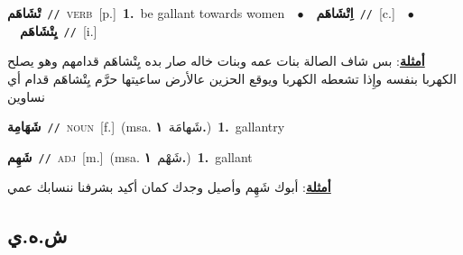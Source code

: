 \documentclass[10pt,a4paper,twoside]{article} %
\begin{document}
\begin{multicols}{2}
{\setlength\topsep{0pt}\textbf{\foreignlanguage{arabic}{تْشَاهَم}}\ {\color{gray}\texttt{//}\color{black}}\ \textsc{verb}\ [p.]\ \textbf{1.}~be gallant towards women\ \ $\bullet$\ \ \setlength\topsep{0pt}\textbf{\foreignlanguage{arabic}{اِتْشَاهَم}}\ {\color{gray}\texttt{//}\color{black}}\ [c.]\ \ $\bullet$\ \ \setlength\topsep{0pt}\textbf{\foreignlanguage{arabic}{يِتْشَاهَم}}\ {\color{gray}\texttt{//}\color{black}}\ [i.]\  \begin{flushright}\color{gray}\foreignlanguage{arabic}{\textbf{\underline{\foreignlanguage{arabic}{أمثلة}}}: بس شاف الصالة بنات عمه وبنات خاله صار بده يِتْشاهَم قدامهم وهو يصلح الكهربا بنفسه وإِذا تشعطه الكهربا ويوقع الحزين عالأرض ساعيتها حرَّم يِتْشاهَم قدام أي نساوين}\end{flushright}\color{black}} \vspace{2mm}

{\setlength\topsep{0pt}\textbf{\foreignlanguage{arabic}{شَهَامِة}}\ {\color{gray}\texttt{//}\color{black}}\ \textsc{noun}\ [f.]\ \color{gray}(msa. \foreignlanguage{arabic}{شَهامَة}~\foreignlanguage{arabic}{\textbf{١.}})\color{black}\ \textbf{1.}~gallantry\ } \vspace{2mm}

{\setlength\topsep{0pt}\textbf{\foreignlanguage{arabic}{شَهِم}}\ {\color{gray}\texttt{//}\color{black}}\ \textsc{adj}\ [m.]\ \color{gray}(msa. \foreignlanguage{arabic}{شَهْم}~\foreignlanguage{arabic}{\textbf{١.}})\color{black}\ \textbf{1.}~gallant\  \begin{flushright}\color{gray}\foreignlanguage{arabic}{\textbf{\underline{\foreignlanguage{arabic}{أمثلة}}}: أبوك شَهِم وأصيل وجدك كمان أكيد بشرفنا ننسابك عمي}\end{flushright}\color{black}} \vspace{2mm}

\vspace{-3mm}
\subsection*{\color{blue}\foreignlanguage{arabic}{ش.ه.ي}\color{blue}{}} 


\end{multicols}
\end{document}
